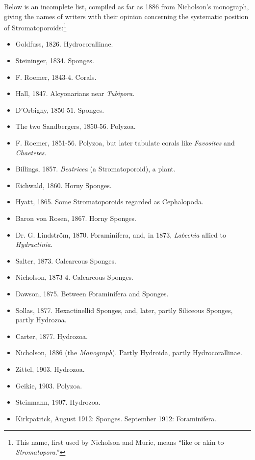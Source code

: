 \documentclass[a4paper, 12pt, oneside, landscape]{article}
\begin{document}
Below is an incomplete list, compiled as far as 1886 from Nicholson's monograph, giving the names of writers with their opinion concerning the systematic position of Stromatoporoids:\footnote{This name, first used by Nicholson and Murie, means ``like or akin to \emph{Stromatopora}.''}
\begin{itemize}
    \item Goldfuss, 1826. Hydrocorallinae.
    \item Steininger, 1834. Sponges.
    \item F. Roemer, 1843-4. Corals.
    \item Hall, 1847. Alcyonarians near \emph{Tubipora}.
    \item D'Orbigny, 1850-51. Sponges.
    \item The two Sandbergers, 1850-56. Polyzoa.
    \item F. Roemer, 1851-56. Polyzoa, but later tabulate corals like \emph{Favosites} and \emph{Chaetetes}.
    \item Billings, 1857. \emph{Beatricea} (a Stromatoporoid), a plant.
    \item Eichwald, 1860. Horny Sponges.
    \item Hyatt, 1865. Some Stromatoporoids regarded as Cephalopoda.
    \item Baron von Rosen, 1867. Horny Sponges.
    \item Dr. G. Lindström, 1870. Foraminifera, and, in 1873, \emph{Labechia} allied to \emph{Hydractinia}.
    \item Salter, 1873. Calcareous Sponges.
    \item Nicholson, 1873-4. Calcareous Sponges.
    \item Dawson, 1875. Between Foraminifera and Sponges.
    \item Sollas, 1877. Hexactinellid Sponges, and, later, partly Siliceous Sponges, partly Hydrozoa.
    \item Carter, 1877. Hydrozoa.
    \item Nicholson, 1886 (the \emph{Monograph}). Partly Hydroida, partly Hydrocorallinae.
    \item Zittel, 1903. Hydrozoa.
    \item Geikie, 1903. Polyzoa.
    \item Steinmann, 1907. Hydrozoa.
    \item Kirkpatrick, August 1912: Sponges. September 1912: Foraminifera.
\end{itemize}
\end{document}
